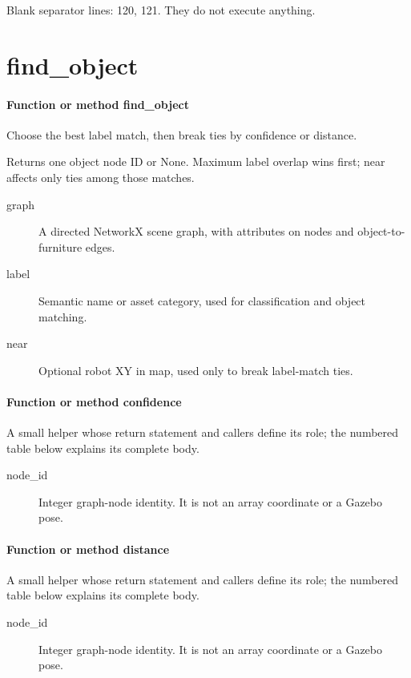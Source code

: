\documentclass[11pt,a4paper]{book}
\begin{document}
Blank separator lines: 120, 121. They do not execute anything.

\section{find\_object}

\paragraph{Function or method find\_object}
Choose the best label match, then break ties by confidence or distance.

Returns one object node ID or None. Maximum label overlap wins first; near affects only ties among those matches.

\begin{description}
\item[graph] A directed NetworkX scene graph, with attributes on nodes and object-to-furniture edges.
\item[label] Semantic name or asset category, used for classification and object matching.
\item[near] Optional robot XY in map, used only to break label-match ties.
\end{description}

\paragraph{Function or method confidence}
A small helper whose return statement and callers define its role; the numbered table below explains its complete body.

\begin{description}
\item[node\_id] Integer graph-node identity. It is not an array coordinate or a Gazebo pose.
\end{description}

\paragraph{Function or method distance}
A small helper whose return statement and callers define its role; the numbered table below explains its complete body.

\begin{description}
\item[node\_id] Integer graph-node identity. It is not an array coordinate or a Gazebo pose.
\end{description}
\end{document}
